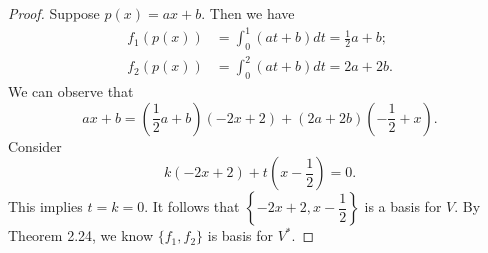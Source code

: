 \begin{Exercise}
	\begin{proof}
		Suppose $p(x) = ax + b$.
		Then we have
		\begin{align*}
		f_1(p(x)) &= \int_{0}^{1}(at + b) dt = \frac{1}{2}a + b; \\
		f_2(p(x)) &= \int_{0}^{2}(at + b) dt = 2a+2b.
		\end{align*}
		We can observe that
		$$
		ax+b = \left(\frac{1}{2}a + b\right) (-2x+2) + (2a+2b)\left(-\frac{1}{2}+x\right).
		$$
		Consider
		$$
		k \left( -2x+2 \right) + t \left( x-\frac{1}{2} \right) = 0.
		$$
		This implies $t = k = 0$.
		It follows that $\left\{-2x+2, x-\dfrac{1}{2}\right\}$ is a basis for $V$.
		By Theorem 2.24, we know $\{f_1, f_2\}$ is basis for $V^*$.
	\end{proof}
\end{Exercise}